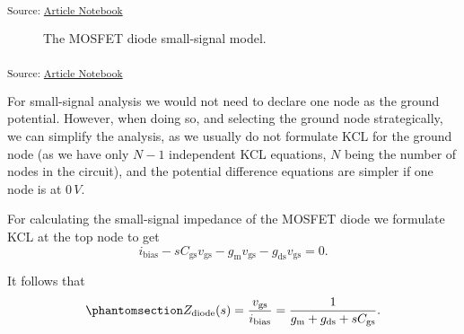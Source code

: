 \documentclass[
  a4paper,
  DIV=11,
  numbers=noendperiod]{scrartcl}
\begin{document}
\textsubscript{Source:
\href{https://iic-jku.github.io/analog-circuit-design/index.qmd.html}{Article
Notebook}}

\begin{figure}[H]


\caption{\label{fig-mosfet-diode-small-signal}The MOSFET diode
small-signal model.}

\end{figure}%

\textsubscript{Source:
\href{https://iic-jku.github.io/analog-circuit-design/index.qmd.html}{Article
Notebook}}

\begin{tcolorbox}[enhanced jigsaw, breakable, title=\textcolor{quarto-callout-note-color}{\faInfo}\hspace{0.5em}{Ground Node Selection}, left=2mm, bottomrule=.15mm, opacitybacktitle=0.6, opacityback=0, colframe=quarto-callout-note-color-frame, leftrule=.75mm, bottomtitle=1mm, colbacktitle=quarto-callout-note-color!10!white, toprule=.15mm, rightrule=.15mm, toptitle=1mm, titlerule=0mm, arc=.35mm, colback=white, coltitle=black]

For small-signal analysis we would not need to declare one node as the
ground potential. However, when doing so, and selecting the ground node
strategically, we can simplify the analysis, as we usually do not
formulate KCL for the ground node (as we have only \(N-1\) independent
KCL equations, \(N\) being the number of nodes in the circuit), and the
potential difference equations are simpler if one node is at \(0\,V\).

\end{tcolorbox}

For calculating the small-signal impedance of the MOSFET diode we
formulate KCL at the top node to get \[
i_\mathrm{bias} - s C_\mathrm{gs}v_\mathrm{gs}- g_\mathrm{m}v_\mathrm{gs}- g_\mathrm{ds}v_\mathrm{gs}= 0.
\]

It follows that
\begin{equation}\phantomsection\label{eq-mosfet-diode-impedance}{
Z_\mathrm{diode}(s) = \frac{v_\mathrm{gs}}{i_\mathrm{bias}} = \frac{1}{g_\mathrm{m}+ g_\mathrm{ds}+ s C_\mathrm{gs}}.
}\end{equation}
\end{document}

